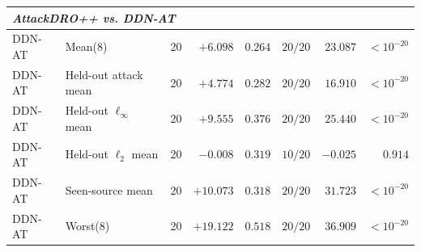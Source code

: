 \begin{table}[H]
\begin{tabular}{llrrrrrr}
\midrule
\multicolumn{8}{l}{\textit{AttackDRO++ vs. DDN-AT}} \\
\midrule
DDN-AT & Mean(8) & 20 & $+6.098$ & $0.264$ & $20/20$ & $23.087$ & $<10^{-20}$ \\
DDN-AT & Held-out attack mean & 20 & $+4.774$ & $0.282$ & $20/20$ & $16.910$ & $<10^{-20}$ \\
DDN-AT & Held-out $\ell_\infty$ mean & 20 & $+9.555$ & $0.376$ & $20/20$ & $25.440$ & $<10^{-20}$ \\
DDN-AT & Held-out $\ell_2$ mean & 20 & $-0.008$ & $0.319$ & $10/20$ & $-0.025$ & $0.914$ \\
DDN-AT & Seen-source mean & 20 & $+10.073$ & $0.318$ & $20/20$ & $31.723$ & $<10^{-20}$ \\
DDN-AT & Worst(8) & 20 & $+19.122$ & $0.518$ & $20/20$ & $36.909$ & $<10^{-20}$ \\

\bottomrule
\end{tabular}
\end{table}




